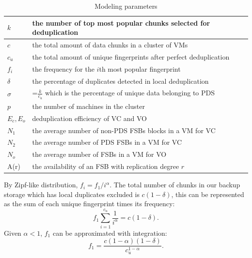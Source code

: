 \begin{table}[htbp]
\centering
\begin{tabular}{|p{1.25cm}|p{5.5cm}|}
\hline
$k$ &  the number of top most popular chunks selected for deduplication\\ 
\hline
$c$ &  the total amount of data chunks in a cluster of VMs\\ 
\hline
$c_u$ &  the total amount of unique fingerprints after perfect  deduplication\\
\hline
$f_i$ &  the frequency for the $i$th most popular fingerprint\\
\hline
$\delta$ &  the percentage of duplicates detected in local deduplication\\
\hline
$\sigma$ & =$\frac{k}{c_u}$ which is  the percentage of unique data  belonging to  PDS\\
\hline
$p$ & the number of machines in the cluster\\
\hline
$E_c, E_o$ & deduplication efficiency of VC and VO \\
\hline
$N_1$ & the average number  of non-PDS FSBs blocks in a VM for VC\\
\hline
$N_2$ & the average number  of PDS FSBs in a VM for VC\\
\hline
$N_o$ & the average number  of FSBs  in a VM for VO\\
\hline
A(r) & the availability of an FSB  with replication degree $r$\\
\hline
\end{tabular}
\caption{Modeling  parameters}
\label{tab:symbol}
\end{table}


By Zipf-like distribution, $f_i = {f_1}/{i^\alpha}.$
The total number of chunks in our backup storage which
has local duplicates excluded is $c (1-\delta)$, this can be represented
as the sum of each unique fingerprint times its frequency:
\[
f_1 \sum_{i=1}^{c_u}\frac{1}{i^\alpha} = c (1-\delta).
\]
Given $\alpha <1$, $f_1$ can be approximated with integration:
\[
f_1=\frac{c(1-\alpha)(1-\delta)}{c_u^{1-\alpha}}.
\]

